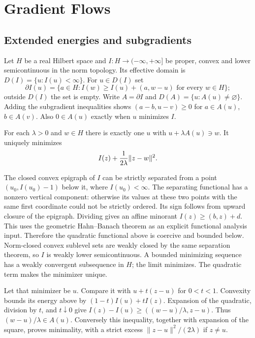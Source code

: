 \section{Gradient Flows}
\label{sec:9-6}
\Needspace{40mm}
\subsection{Extended energies and subgradients}
Let $H$ be a real Hilbert space and $I:H\to(-\infty,+\infty]$ be
proper, convex and lower semicontinuous in the norm topology.
Its effective domain is $D(I)=\{u:I(u)<\infty\}$. For $u\in D(I)$ set
\[
 \partial I(u)=\{a\in H:I(w)\geq I(u)+(a,w-u)\text{ for every }w\in H\};
\]
outside $D(I)$ the set is empty. Write $A=\partial I$ and
$D(A)=\{u:A(u)\ne\varnothing\}$. Adding the subgradient inequalities
shows $(a-b,u-v)\geq0$ for $a\in A(u)$, $b\in A(v)$.
Also $0\in A(u)$ exactly when $u$ minimizes $I$.
\Needspace{42mm}
\Needspace{50mm}
\begin{theorem}
For each $\lambda>0$ and $w\in H$ there is exactly one $u$ with
$u+\lambda A(u)\ni w$. It uniquely minimizes
\[
 I(z)+{1\over2\lambda}\|z-w\|^2.
\]
\end{theorem}
\begin{expandedproof}
The closed convex epigraph of $I$ can be strictly separated from a point
$(u_0,I(u_0)-1)$ below it, where $I(u_0)<\infty$.
The separating functional has a nonzero vertical component: otherwise
its values at these two points with the same first coordinate could not
be strictly ordered. Its sign follows from upward closure of the epigraph.
Dividing gives an affine minorant $I(z)\geq(b,z)+d$.
This uses the geometric Hahn--Banach theorem as an explicit functional
analysis input. Therefore the quadratic functional above is coercive
and bounded below. Norm-closed convex sublevel sets are weakly closed
by the same separation theorem, so $I$ is weakly lower semicontinuous.
A bounded minimizing sequence has a weakly convergent subsequence in $H$;
the limit minimizes. The quadratic term makes the minimizer unique.

Let that minimizer be $u$. Compare it with $u+t(z-u)$ for $0<t<1$.
Convexity bounds its energy above by $(1-t)I(u)+tI(z)$. Expansion of
the quadratic, division by $t$, and $t\downarrow0$ give
$I(z)-I(u)\geq((w-u)/\lambda,z-u)$.
Thus $(w-u)/\lambda\in A(u)$. Conversely this inequality, together
with expansion of the square, proves minimality, with a strict excess
$\|z-u\|^2/(2\lambda)$ if $z\ne u$.
\end{expandedproof}
